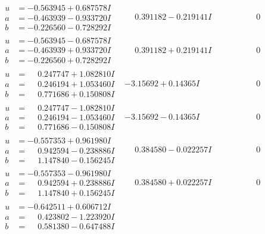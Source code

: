 \documentclass[1p]{elsarticle_modified}
\theoremstyle{definition}
\begin{document}
$$\begin{array}{c|c|c}
\begin{aligned}
u &= -0.563945 + 0.687578 I \\
a &= -0.463939 - 0.933720 I \\
b &= -0.226560 - 0.728292 I\end{aligned}
 & \phantom{-}0.391182 - 0.219141 I & \phantom{-0.000000 } 0 \\ \hline\begin{aligned}
u &= -0.563945 - 0.687578 I \\
a &= -0.463939 + 0.933720 I \\
b &= -0.226560 + 0.728292 I\end{aligned}
 & \phantom{-}0.391182 + 0.219141 I & \phantom{-0.000000 } 0 \\ \hline\begin{aligned}
u &= \phantom{-}0.247747 + 1.082810 I \\
a &= \phantom{-}0.246194 + 1.053460 I \\
b &= \phantom{-}0.771686 + 0.150808 I\end{aligned}
 & -3.15692 + 0.14365 I & \phantom{-0.000000 } 0 \\ \hline\begin{aligned}
u &= \phantom{-}0.247747 - 1.082810 I \\
a &= \phantom{-}0.246194 - 1.053460 I \\
b &= \phantom{-}0.771686 - 0.150808 I\end{aligned}
 & -3.15692 - 0.14365 I & \phantom{-0.000000 } 0 \\ \hline\begin{aligned}
u &= -0.557353 + 0.961980 I \\
a &= \phantom{-}0.942594 - 0.238886 I \\
b &= \phantom{-}1.147840 - 0.156245 I\end{aligned}
 & \phantom{-}0.384580 - 0.022257 I & \phantom{-0.000000 } 0 \\ \hline\begin{aligned}
u &= -0.557353 - 0.961980 I \\
a &= \phantom{-}0.942594 + 0.238886 I \\
b &= \phantom{-}1.147840 + 0.156245 I\end{aligned}
 & \phantom{-}0.384580 + 0.022257 I & \phantom{-0.000000 } 0 \\ \hline\begin{aligned}
u &= -0.642511 + 0.606712 I \\
a &= \phantom{-}0.423802 - 1.223920 I \\
b &= \phantom{-}0.581380 - 0.647488 I\end{aligned}

\end{array}$$
\end{document}
